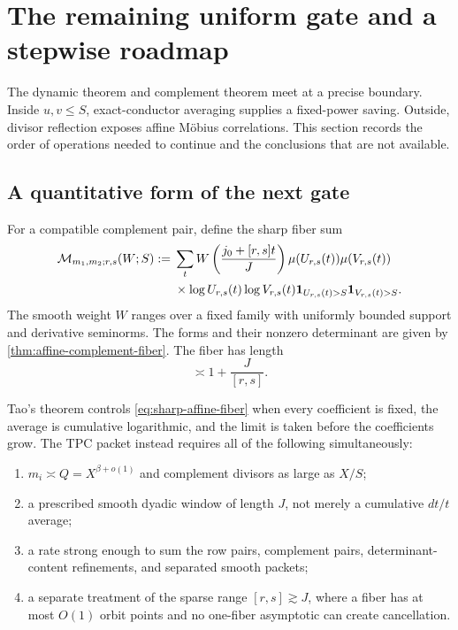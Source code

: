 \section{The remaining uniform gate and a stepwise roadmap}
\label{sec:barriers-roadmap}

The dynamic theorem and complement theorem meet at a precise boundary.
Inside \(u,v\le S\), exact-conductor averaging supplies a fixed-power
saving.  Outside, divisor reflection exposes affine M\"obius
correlations.  This section records the order of operations needed to
continue and the conclusions that are not available.

\subsection{A quantitative form of the next gate}

For a compatible complement pair, define the sharp fiber sum
\begin{align}
 \mathcal M_{m_1,m_2;r,s}(W;S)
 :={}&\sum_t W\left(\frac{j_0+[r,s]t}{J}\right)
 \mu(U_{r,s}(t))\mu(V_{r,s}(t))
 \notag\\
 &\times\log U_{r,s}(t)\log V_{r,s}(t)
 \mathbf 1_{U_{r,s}(t)>S}\mathbf 1_{V_{r,s}(t)>S}.
 \label{eq:sharp-affine-fiber}
\end{align}
The smooth weight \(W\) ranges over a fixed family with uniformly
bounded support and derivative seminorms.  The
forms and their nonzero determinant are given by
\cref{thm:affine-complement-fiber}.  The fiber has length
\begin{equation}
 \asymp 1+\frac{J}{[r,s]}.
 \label{eq:fiber-length}
\end{equation}

Tao's theorem controls \eqref{eq:sharp-affine-fiber} when every
coefficient is fixed, the average is cumulative logarithmic, and the
limit is taken before the coefficients grow.  The TPC packet instead
requires all of the following simultaneously:
\begin{enumerate}[label=\textup{(\roman*)}]
 \item \(m_i\asymp Q=X^{\beta+o(1)}\) and complement divisors as large
 as \(X/S\);
 \item a prescribed smooth dyadic window of length \(J\), not merely a
 cumulative \(dt/t\) average;
 \item a rate strong enough to sum the row pairs, complement pairs,
 determinant-content refinements, and separated smooth packets;
 \item a separate treatment of the sparse range \([r,s]\gtrsim J\),
 where a fiber has at most \(O(1)\) orbit points and no one-fiber
 asymptotic can create cancellation.
\end{enumerate}

